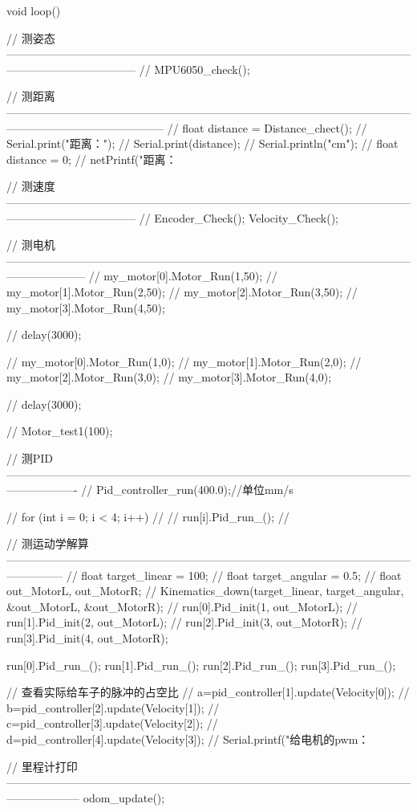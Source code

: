 void loop()
{
    // 测姿态-----------------------------------------------------------------------------------------------------------------------------------------------
    // MPU6050_check();

    // 测距离------------------------------------------------------------------------------------------------------------------------------------------------------
    // float distance = Distance_chect();
    // Serial.print("距离：");
    // Serial.print(distance);
    // Serial.println("cm");
    // float distance = 0;
    // netPrintf("距离：%

    // 测速度-----------------------------------------------------------------------------------------------------------------------------------------------
    // Encoder_Check();
    Velocity_Check();

    // 测电机---------------------------------------------------------------------------------------------------------------------------------
    //  my_motor[0].Motor_Run(1,50);
    //  my_motor[1].Motor_Run(2,50);
    //  my_motor[2].Motor_Run(3,50);
    //  my_motor[3].Motor_Run(4,50);

    //  delay(3000);

    //  my_motor[0].Motor_Run(1,0);
    //  my_motor[1].Motor_Run(2,0);
    //  my_motor[2].Motor_Run(3,0);
    //  my_motor[3].Motor_Run(4,0);

    //  delay(3000);

    // Motor_test1(100);

    // 测PID-------------------------------------------------------------------------------------------------------------------------------
    // Pid_controller_run(400.0);//单位mm/s

    // for (int i = 0; i < 4; i++)
    // {
    //     run[i].Pid_run_();
    // }

    // 测运动学解算---------------------------------------------------------------------------------------------------------------------------
    // float target_linear = 100;
    // float target_angular = 0.5;
    // float out_MotorL, out_MotorR;
    // Kinematics_down(target_linear, target_angular, &out_MotorL, &out_MotorR);
    // run[0].Pid_init(1, out_MotorL);
    // run[1].Pid_init(2, out_MotorL);
    // run[2].Pid_init(3, out_MotorR);
    // run[3].Pid_init(4, out_MotorR);

    run[0].Pid_run_();
    run[1].Pid_run_();
    run[2].Pid_run_();
    run[3].Pid_run_();

    // 查看实际给车子的脉冲的占空比
    //  a=pid_controller[1].update(Velocity[0]);
    //  b=pid_controller[2].update(Velocity[1]);
    //  c=pid_controller[3].update(Velocity[2]);
    //  d=pid_controller[4].update(Velocity[3]);
    //  Serial.printf("给电机的pwm：%

    // 里程计打印--------------------------------------------------------------------------------------------------------------------------------
    odom_update();

}
